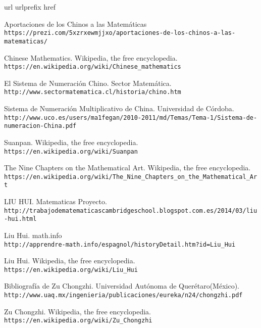 \begin{thebibliography}{10}
\expandafter\ifx\csname url\endcsname\relax
  \def\url#1{\texttt{#1}}\fi
\expandafter\ifx\csname urlprefix\endcsname\relax\def\urlprefix{URL }\fi
\expandafter\ifx\csname href\endcsname\relax
  \def\href#1#2{#2} \def\path#1{#1}\fi

Aportaciones de los Chinos a las Matemáticas\\
  \url{https://prezi.com/5xzrxewmjjxo/aportaciones-de-los-chinos-a-las-matematicas/}

Chinese Mathematics. Wikipedia, the free encyclopedia.\\
  \url{https://en.wikipedia.org/wiki/Chinese_mathematics}

El Sistema de Numeración Chino. Sector Matemática.\\
  \url{http://www.sectormatematica.cl/historia/chino.htm}

Sistema de Numeración Multiplicativo de China. Universidad de Córdoba.\\
  \url{http://www.uco.es/users/ma1fegan/2010-2011/md/Temas/Tema-1/Sistema-de-numeracion-China.pdf}

Suanpan. Wikipedia, the free encyclopedia.\\
  \url{https://en.wikipedia.org/wiki/Suanpan}
  
The Nine Chapters on the Mathematical Art. Wikipedia, the free encyclopedia.\\
  \url{https://en.wikipedia.org/wiki/The_Nine_Chapters_on_the_Mathematical_Art}  
  
LIU HUI. Matematicas Proyecto.\\
  \url{http://trabajodematematicascambridgeschool.blogspot.com.es/2014/03/liu-hui.html}

Liu Hui. math.info\\
  \url{http://apprendre-math.info/espagnol/historyDetail.htm?id=Liu_Hui}
  
Liu Hui. Wikipedia, the free encyclopedia.\\
  \url{https://en.wikipedia.org/wiki/Liu_Hui}
  
Bibliografía de Zu Chongzhi. Universidad Autónoma de Querétaro(México).\\
  \url{http://www.uaq.mx/ingenieria/publicaciones/eureka/n24/chongzhi.pdf}

Zu Chongzhi. Wikipedia, the free encyclopedia.\\
  \url{https://en.wikipedia.org/wiki/Zu_Chongzhi}

\end{thebibliography}

